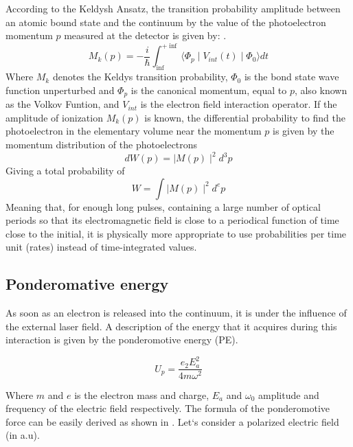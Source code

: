 According to the Keldysh Ansatz, the transition probability amplitude between an atomic bound state and the continuum by the value of the photoelectron momentum $p$ measured at the detector is given by: \cite{popruzhenko_keldysh_2014}.
 \begin{equation}
 M_{k}(p) = -\dfrac{i}{\hbar} \int_{\inf}^{+\inf} \langle \Phi_{p}\mid  V_{int}(t)\mid \Phi_{0} \rangle dt
 \end{equation}
Where $M_{k}$ denotes the Keldys transition probability, $\Phi_{0}$ is the bond state wave function unperturbed and $\Phi_{p}$ is the canonical momentum, equal to $p$, also known as the Volkov Funtion, and $V_{int}$ is the electron field interaction operator. 
If the amplitude of ionization $M_{k}(p)$ is known, the differential probability to find the photoelectron in the elementary volume near the momentum $p$ is given by the momentum distribution of the photoelectrons 
\begin{equation}
dW(p)=\mid M(p)\mid^{2} d^{3}p
\end{equation}
 Giving a total probability of
 \begin{equation}
 W= \int \mid M(p)\mid^{2} d^{e}p
 \end{equation}
Meaning that, for enough long pulses, containing a large number of optical periods so that its electromagnetic field is close to a periodical function of time close to the initial, it is physically more appropriate to use probabilities per time unit (rates) instead of time-integrated values.

\subsection{Ponderomative energy}


As soon as an electron is released into the continuum, it is  under the influence of the external laser field. A description of the energy that it acquires during this interaction is given by the ponderomotive energy (PE).

\begin{equation}
U_{p} = \dfrac{e_{2}E_{a}^{2}}{4m \omega^{2}}
\end{equation}

Where $m$ and $e$ is the electron mass and charge, $E_{a}$ and $\omega_{0}$  amplitude and frequency of the electric field respectively. The formula of the ponderomotive force can be easily  derived as shown in \cite{protopapas_atomic_1997}\cite{connerade_highly_1998}. Let`s consider a polarized electric field (in a.u).

